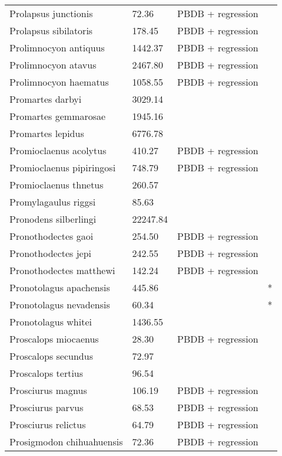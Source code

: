 \documentclass{article}
\begin{document}
\begin{center}
\begin{longtable}{p{} p{} p{} p{}}
    Prolapsus junctionis & 72.36 & PBDB + regression &  \\ 
    Prolapsus sibilatoris & 178.45 & PBDB + regression &  \\ 
    Prolimnocyon antiquus & 1442.37 & PBDB + regression &  \\ 
    Prolimnocyon atavus & 2467.80 & PBDB + regression &  \\ 
    Prolimnocyon haematus & 1058.55 & PBDB + regression &  \\ 
    Promartes darbyi & 3029.14 & \cite{Dawson2007} &  \\ 
    Promartes gemmarosae & 1945.16 & \cite{Dawson2007} &  \\ 
    Promartes lepidus & 6776.78 & \cite{Mora2005} &  \\ 
    Promioclaenus acolytus & 410.27 & PBDB + regression &  \\ 
    Promioclaenus pipiringosi & 748.79 & PBDB + regression &  \\ 
    Promioclaenus thnetus & 260.57 & \cite{Gazin1930} &  \\ 
    Promylagaulus riggsi & 85.63 & \cite{Tomiya2013} &  \\ 
    Pronodens silberlingi & 22247.84 & \cite{Tomiya2013} &  \\ 
    Pronothodectes gaoi & 254.50 & PBDB + regression &  \\ 
    Pronothodectes jepi & 242.55 & PBDB + regression &  \\ 
    Pronothodectes matthewi & 142.24 & PBDB + regression &  \\ 
    Pronotolagus apachensis & 445.86 & \cite{Tomiya2013} & * \\ 
    Pronotolagus nevadensis & 60.34 & \cite{Tomiya2013} & * \\ 
    Pronotolagus whitei & 1436.55 & \cite{Tomiya2013} &  \\ 
    Proscalops miocaenus & 28.30 & PBDB + regression &  \\ 
    Proscalops secundus & 72.97 & \cite{Tomiya2013} &  \\ 
    Proscalops tertius & 96.54 & \cite{Tomiya2013} &  \\ 
    Prosciurus magnus & 106.19 & PBDB + regression &  \\ 
    Prosciurus parvus & 68.53 & PBDB + regression &  \\ 
    Prosciurus relictus & 64.79 & PBDB + regression &  \\ 
    Prosigmodon chihuahuensis & 72.36 & PBDB + regression &  \\ 

\end{longtable}
\end{center}
\end{document}
